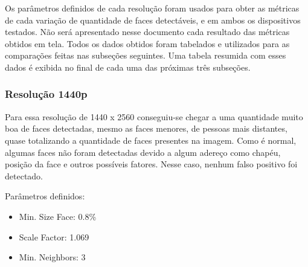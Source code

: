 Os parâmetros definidos de cada resolução foram usados para obter as métricas de cada variação de quantidade de faces detectáveis, e em ambos os dispositivos testados. Não será apresentado nesse documento cada resultado das métricas obtidos em tela. Todos os dados obtidos foram tabelados e utilizados para as comparações feitas nas subseções seguintes. Uma tabela resumida com esses dados é exibida no final de cada uma das próximas três subseções.


\subsubsection{Resolução 1440p} \label{sssec:resolution1-1}

Para essa resolução de 1440 x 2560 conseguiu-se chegar a uma quantidade muito boa de faces detectadas, mesmo as faces menores, de pessoas mais distantes, quase totalizando a quantidade de faces presentes na imagem. Como é normal, algumas faces não foram detectadas devido a algum adereço como chapéu, posição da face e outros possíveis fatores. Nesse caso, nenhum falso positivo foi detectado.

Parâmetros definidos: 
\begin{itemize}
    \item Min. Size Face: 0.8\%
    \item Scale Factor: 1.069
    \item Min. Neighbors: 3
\end{itemize}

